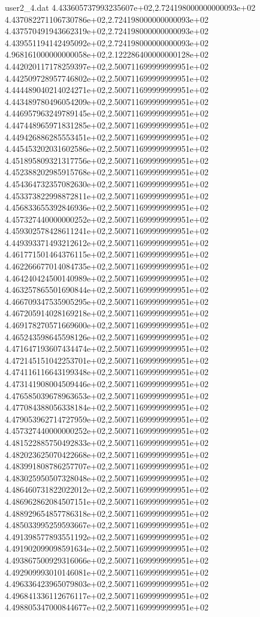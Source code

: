 \begin{filecontents}{user2_4.dat}
4.433605737993235607e+02,2.724198000000000093e+02
4.437082271106730786e+02,2.724198000000000093e+02
4.437570491943662319e+02,2.724198000000000093e+02
4.439551194142495092e+02,2.724198000000000093e+02
4.968161000000000058e+02,2.122286400000000128e+02
4.442020117178259397e+02,2.500711699999999951e+02
4.442509728957746802e+02,2.500711699999999951e+02
4.444489040214024271e+02,2.500711699999999951e+02
4.443489780496054209e+02,2.500711699999999951e+02
4.446957963249789145e+02,2.500711699999999951e+02
4.447448965971831285e+02,2.500711699999999951e+02
4.449426886285553451e+02,2.500711699999999951e+02
4.445453202031602586e+02,2.500711699999999951e+02
4.451895809321317756e+02,2.500711699999999951e+02
4.452388202985915768e+02,2.500711699999999951e+02
4.454364732357082630e+02,2.500711699999999951e+02
4.453373822998872811e+02,2.500711699999999951e+02
4.456833655392846936e+02,2.500711699999999951e+02
4.457327440000000252e+02,2.500711699999999951e+02
4.459302578428611241e+02,2.500711699999999951e+02
4.449393371493212612e+02,2.500711699999999951e+02
4.461771501464376115e+02,2.500711699999999951e+02
4.462266677014084735e+02,2.500711699999999951e+02
4.464240424500140989e+02,2.500711699999999951e+02
4.463257865501690844e+02,2.500711699999999951e+02
4.466709347535905295e+02,2.500711699999999951e+02
4.467205914028169218e+02,2.500711699999999951e+02
4.469178270571669600e+02,2.500711699999999951e+02
4.465243598645598126e+02,2.500711699999999951e+02
4.471647193607434474e+02,2.500711699999999951e+02
4.472145151042253701e+02,2.500711699999999951e+02
4.474116116643199348e+02,2.500711699999999951e+02
4.473141908004509446e+02,2.500711699999999951e+02
4.476585039678963653e+02,2.500711699999999951e+02
4.477084388056338184e+02,2.500711699999999951e+02
4.479053962714727959e+02,2.500711699999999951e+02
4.457327440000000252e+02,2.500711699999999951e+02
4.481522885750492833e+02,2.500711699999999951e+02
4.482023625070422668e+02,2.500711699999999951e+02
4.483991808786257707e+02,2.500711699999999951e+02
4.483025950507328048e+02,2.500711699999999951e+02
4.486460731822022012e+02,2.500711699999999951e+02
4.486962862084507151e+02,2.500711699999999951e+02
4.488929654857786318e+02,2.500711699999999951e+02
4.485033995259593667e+02,2.500711699999999951e+02
4.491398577893551192e+02,2.500711699999999951e+02
4.491902099098591634e+02,2.500711699999999951e+02
4.493867500929316066e+02,2.500711699999999951e+02
4.492909993010146081e+02,2.500711699999999951e+02
4.496336423965079803e+02,2.500711699999999951e+02
4.496841336112676117e+02,2.500711699999999951e+02
4.498805347000844677e+02,2.500711699999999951e+02

\end{filecontents}
